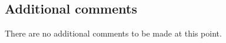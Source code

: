 

\subsection{Additional comments}
%
%

There are no additional comments to be made at this point.


